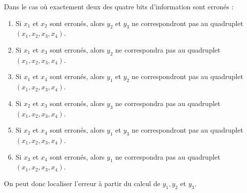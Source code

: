 \documentclass[a4paper,10pt,exos]{nsi}
\begin{document}
\begin{enumalph}
        Dans le cas où exactement deux des quatre bits d'information sont erronés :
        \begin{enumerate}[label=\textbullet]
            \item Si $x_1$ et $x_2$ sont erronés, alors $y_2$ et $y_3$ ne correspondront pas au quadruplet $(x_1,x_2,x_3,x_4)$.
            \item Si $x_1$ et $x_3$ sont erronés, alors $y_2$ ne correspondra pas au quadruplet $(x_1,x_2,x_3,x_4)$.
            \item Si $x_1$ et $x_4$ sont erronés, alors $y_1$ et $y_2$ ne correspondront pas au quadruplet $(x_1,x_2,x_3,x_4)$.
            \item Si $x_2$ et $x_3$ sont erronés, alors $y_3$ ne correspondra pas au quadruplet $(x_1,x_2,x_3,x_4)$.
            \item Si $x_2$ et $x_4$ sont erronés, alors $y_1$ et $y_3$ ne correspondront pas au quadruplet $(x_1,x_2,x_3,x_4)$.
            \item Si $x_3$ et $x_4$ sont erronés, alors $y_1$ ne correspondra pas au quadruplet $(x_1,x_2,x_3,x_4)$.
        \end{enumerate}
        On peut donc localiser l'erreur à partir du calcul de $y_1, y_2$ et $y_3$.
    \end{enumalph}
\end{document}

